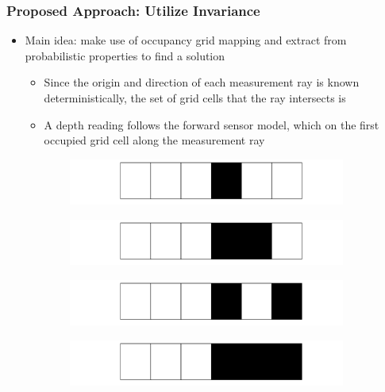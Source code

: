 \documentclass[11pt,professionalfonts,hyperref={pdftex,pdfpagemode=none,pdfstartview=FitH}]{beamer}
\renewcommand{\emph}[1]{\textit{\textbf{\color{blue}{#1}}}}
\begin{document}
\begin{frame}
\frametitle{Proposed Approach: Utilize Invariance}

\begin{itemize}
    \item Main idea: make use of occupancy grid mapping \emph{assumptions} and extract \emph{patterns} from probabilistic properties to find a \emph{computationally-efficient} solution
	\begin{itemize}
		\item Since the origin and direction of each measurement ray is known deterministically, the set of grid cells that the ray intersects is \emph{known through geometry}
		\item A depth reading follows the forward sensor model, which \emph{only depends} on the first occupied grid cell along the measurement ray
	\end{itemize}
\end{itemize}
\setcounter{subfigure}{0}
\begin{figure}
  \centering
  \begin{subfigure}[t]{.45\linewidth}
    \centering\includegraphics[width=\linewidth]{rkplus_1.png}
  \end{subfigure}
  \begin{subfigure}[t]{.45\linewidth}
    \centering\includegraphics[width=\linewidth]{rkplus_2.png}
  \end{subfigure}
    \begin{subfigure}[t]{.45\linewidth}
    \centering\includegraphics[width=\linewidth]{rkplus_3.png}
  \end{subfigure}
  \begin{subfigure}[t]{.45\linewidth}
    \centering\includegraphics[width=\linewidth]{rkplus_4.png}
  \end{subfigure}
\end{figure}

\end{frame}
\end{document}
